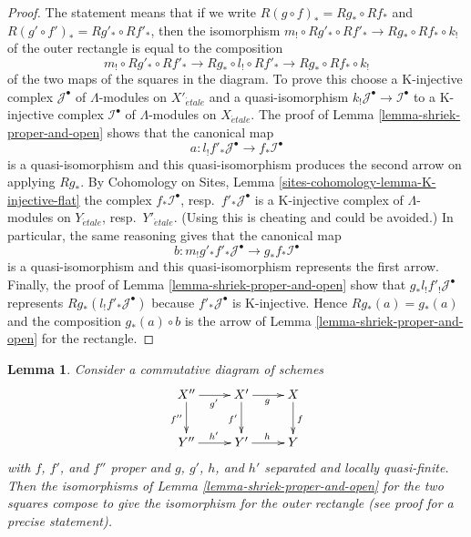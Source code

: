 \documentclass{stacks-project}
\theoremstyle{plain}
\newtheorem{lemma}[subsection]{Lemma}
\theoremstyle{definition}
\theoremstyle{remark}
\numberwithin{equation}{subsection}
\def\etale{{\acute{e}tale}}
\begin{document}
\begin{proof}
The statement means that if we write
$R(g \circ f)_* = Rg_* \circ Rf_*$ and
$R(g' \circ f')_* = Rg'_* \circ Rf'_*$,
then the isomorphism
$m_! \circ Rg'_* \circ Rf'_* \to Rg_* \circ Rf_* \circ k_!$
of the outer rectangle is equal to the composition
$$
m_! \circ Rg'_* \circ Rf'_* \to
Rg_* \circ l_! \circ Rf'_* \to
Rg_* \circ Rf_* \circ k_!
$$
of the two maps of the squares in the diagram. To prove this choose
a K-injective complex $\mathcal{J}^\bullet$ of $\Lambda$-modules
on $X'_\etale$ and a quasi-isomorphism
$k_!\mathcal{J}^\bullet \to \mathcal{I}^\bullet$
to a K-injective complex $\mathcal{I}^\bullet$ of $\Lambda$-modules
on $X_\etale$. The proof of Lemma \ref{lemma-shriek-proper-and-open}
shows that the canonical map
$$
a : l_!f'_*\mathcal{J}^\bullet \to f_*\mathcal{I}^\bullet
$$
is a quasi-isomorphism and this quasi-isomorphism produces the
second arrow on applying $Rg_*$. By
Cohomology on Sites, Lemma \ref{sites-cohomology-lemma-K-injective-flat}
the complex $f_*\mathcal{I}^\bullet$, resp.\ $f'_*\mathcal{J}^\bullet$
is a K-injective complex of $\Lambda$-modules on 
$Y_\etale$, resp.\ $Y'_\etale$.
(Using this is cheating and could be avoided.)
In particular, the same reasoning gives that the canonical map
$$
b : m_!g'_*f'_*\mathcal{J}^\bullet \to g_*f_*\mathcal{I}^\bullet
$$
is a quasi-isomorphism and this quasi-isomorphism represents
the first arrow. Finally, the proof of Lemma \ref{lemma-shriek-proper-and-open}
show that $g_*l_!f'_!\mathcal{J}^\bullet$ represents
$Rg_*(l_!f'_*\mathcal{J}^\bullet)$ because $f'_*\mathcal{J}^\bullet$
is K-injective. Hence $Rg_*(a) = g_*(a)$ and the composition
$g_*(a) \circ b$ is the arrow of Lemma \ref{lemma-shriek-proper-and-open}
for the rectangle.
\end{proof}

\begin{lemma}
\label{lemma-shriek-proper-and-open-compose-horizontal}
Consider a commutative diagram of schemes
$$
\xymatrix{
X'' \ar[r]_{g'} \ar[d]_{f''} &
X' \ar[r]_g \ar[d]_{f'} &
X \ar[d]^f \\
Y'' \ar[r]^{h'} &
Y' \ar[r]^h &
Y
}
$$
with $f$, $f'$, and $f''$ proper and
$g$, $g'$, $h$, and $h'$ separated and locally quasi-finite.
Then the isomorphisms of Lemma \ref{lemma-shriek-proper-and-open}
for the two squares compose to give the isomorphism
for the outer rectangle (see proof for a precise statement).
\end{lemma}
\end{document}
